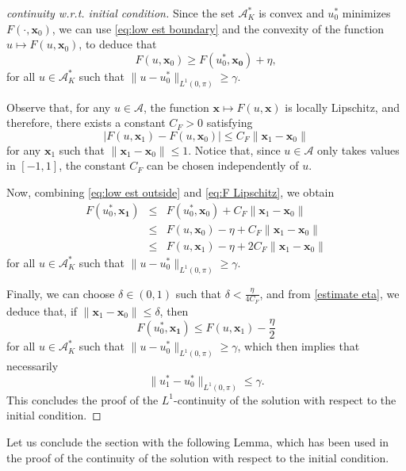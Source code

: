 \documentclass[twocolumn]{autart}    %
\begin{document}
\begin{proof}[continuity w.r.t. initial condition]
Since the set $\mathcal{A}_K^\ast$ is convex and $u_0^\ast$ minimizes $F(\cdot , \bm{x}_0)$, we can use \eqref{eq:low est boundary} and the convexity of the function $u\mapsto F(u, \bm{x}_0)$, to deduce that
\begin{equation}\label{eq:low est outside}
 F(u, \bm{x}_0)  \geq F(u_0^\ast, \bm{x_0})  + \eta,
\end{equation}
for all $u\in \mathcal{A}_K^\ast$ such that  $\| u-u_0^\ast\|_{L^1(0,\pi)} \geq \gamma$.

Observe that, for any $u\in \mathcal{A}$, the function $\bm{x} \mapsto F(u, \bm{x})$  is  locally Lipschitz, and therefore,  there exists a constant $C_F>0$ satisfying
\begin{equation}
\label{eq:F Lipschitz}
|F(u,  \bm{x}_1) -  F(u,  \bm{x}_0) |
 \leq  C_F \| \bm{x}_1 - \bm{x}_0\|
\end{equation}
for any  $\bm{x}_1$ such that 
$\| \bm{x}_1-\bm{x}_0\| \leq 1$. Notice that, since $u\in\mathcal{A}$ only takes values in $[-1,1]$, the constant $C_F$ can be chosen independently of $u$.


Now,  combining  \eqref{eq:low est outside} and \eqref{eq:F Lipschitz}, we obtain
\begin{equation}\label{estimate eta}
\begin{array}{rcl}
F(u_0^\ast, \bm{x_1}) & \leq &  F(u_0^\ast,  \bm{x}_0) +  C_F \| \bm{x}_1- \bm{x}_0\| \\
& \leq &  F(u,  \bm{x}_0) - \eta +  C_F \| \bm{x}_1- \bm{x}_0\| \\
& \leq &  F(u,  \bm{x}_1) - \eta  + 2 C_F \| \bm{x}_1- \bm{x}_0\|  
\end{array}
\end{equation}
for all $u\in \mathcal{A}_K^\ast$ such that  $\| u-u_0^\ast\|_{L^1(0,\pi)} \geq \gamma$. 

Finally, we can choose $\delta \in (0,1)$ such that $\delta <\frac{\eta}{4C_F}$,  and from \eqref{estimate eta}, we deduce that, if $\|\bm{x}_1 - \bm{x}_0\| \leq \delta$,  then
$$
F(u_0^\ast, \bm{x_1})  \leq F(u,  \bm{x}_1)  - \dfrac{\eta}{2}
$$
for all $u\in \mathcal{A}_K^\ast$ such that  $\| u-u_0^\ast\|_{L^1(0,\pi)} \geq \gamma$, which then implies that necessarily
$$
\| u_1^\ast-u_0^\ast\|_{L^1(0,\pi)} \leq \gamma.   
$$
This concludes the proof of the $L^1$-continuity of the solution with respect to the initial condition.
\end{proof}

\medskip

Let us conclude the section with the following Lemma, which has been used in the proof of the continuity of the solution with respect to the initial condition.
\end{document}
